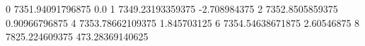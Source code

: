 0 7351.94091796875 0.0
1 7349.23193359375 -2.708984375
2 7352.8505859375 0.90966796875
4 7353.78662109375 1.845703125
6 7354.54638671875 2.60546875
8 7825.224609375 473.28369140625
